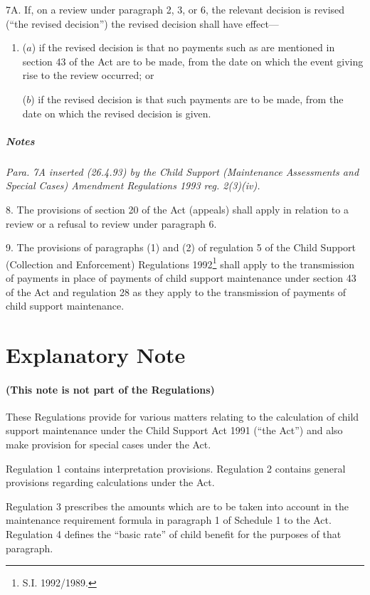 \documentclass[a4paper]{article}
\newcommand{\parthead}{}
\newcommand\amendment[1]{\subsubsection*{Notes}{\itshape\frenchspacing\footnotesize #1 \par\goodbreak}}
\begin{document}
7A.  If, on a review under paragraph 2, 3, or 6, the relevant decision is revised (“the revised decision”) the revised decision shall have effect—
\begin{enumerate}\item[]
($a$) if the revised decision is that no payments such as are mentioned in section 43 of the Act are to be made, from the date on which the event giving rise to the review occurred; or

($b$) if the revised decision is that such payments are to be made, from the date on which the revised decision is given.
\end{enumerate}

\amendment{
Para. 7A inserted (26.4.93) by the Child Support (Maintenance Assessments and Special Cases) Amendment Regulations 1993 reg. 2(3)(iv).
}

\medskip

8.  The provisions of section 20 of the Act (appeals) shall apply in relation to a review or a refusal to review under paragraph 6.

\medskip

9.  The provisions of paragraphs (1) and (2) of regulation 5 of the Child Support (Collection and Enforcement) Regulations 1992\footnote{\frenchspacing  S.I. 1992/1989.} shall apply to the transmission of payments in place of payments of child support maintenance under section 43 of the Act and regulation 28 as they apply to the transmission of payments of child support maintenance.

\part{Explanatory Note}

\renewcommand\parthead{--- Explanatory Note}

\subsection*{(This note is not part of the Regulations)}

These Regulations provide for various matters relating to the calculation of child support maintenance under the Child Support Act 1991 (“the Act”) and also make provision for special cases under the Act.

Regulation 1 contains interpretation provisions. Regulation 2 contains general provisions regarding calculations under the Act.

Regulation 3 prescribes the amounts which are to be taken into account in the maintenance requirement formula in paragraph 1 of Schedule 1 to the Act. Regulation 4 defines the “basic rate” of child benefit for the purposes of that paragraph.
\end{document}
